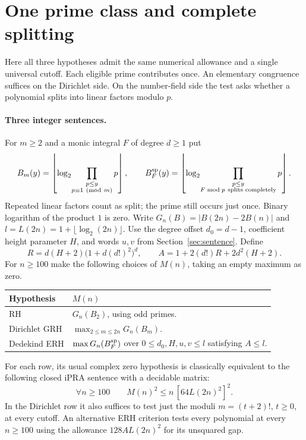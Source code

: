 \section{One prime class and complete splitting}\label{sec:split}
Here all three hypotheses admit the same numerical allowance and a single universal cutoff. Each eligible prime contributes once. An elementary congruence suffices on the Dirichlet side. On the number-field side the test asks whether a polynomial splits into linear factors modulo $p$.

\paragraph{Three integer sentences.}
For $m\ge2$ and a monic integral $F$ of degree $d\ge1$ put
\[
 B_m(y)=\left\lfloor\log_2\!\prod_{\substack{p\le y\\p\equiv1\ ({\rm mod}\ m)}}p\right\rfloor,
 \qquad
 B_F^{\rm sp}(y)=\left\lfloor\log_2\!\prod_{\substack{p\le y\\F\bmod p\ \text{splits completely}}}p\right\rfloor .
\]
Repeated linear factors count as split; the prime still occurs just once. Binary logarithm of the product $1$ is zero. Write $G_n(B)=|B(2n)-2B(n)|$ and $l=L(2n)=1+\lfloor\log_2(2n)\rfloor$. Use the degree offset $d_0=d-1$, coefficient height parameter $H$, and words $u,v$ from Section~\ref{sec:sentence}. Define
\[
 R=d(H+2)\bigl(1+d(d!)^2\bigr)^d,\qquad
 A=1+2(d!)R+2d^2(H+2).
\]
For $n\ge100$ make the following choices of $M(n)$, taking an empty maximum as zero.
\begin{center}\small
\begin{tabular}{@{}lp{.76\linewidth}@{}}\toprule
Hypothesis & $M(n)$\\\midrule
RH & $G_n(B_2)$, using odd primes.\\[3pt]
Dirichlet GRH & $\max_{2\le m\le2n}G_n(B_m)$.\\[3pt]
Dedekind ERH & $\max G_n(B_F^{\rm sp})$ over $0\le d_0,H,u,v\le l$ satisfying $A\le l$.\\\bottomrule
\end{tabular}
\end{center}
\begin{theorem}\label{thm:split}
For each row, its usual complex zero hypothesis is classically equivalent to the following closed iPRA sentence with a decidable matrix:
\[
                \forall n\ge100\qquad M(n)^2\le n\,[64 L(2n)^2]^2.
\]
In the Dirichlet row it also suffices to test just the moduli $m=(t+2)!$, $t\ge0$, at every cutoff. An alternative ERH criterion tests every polynomial at every $n\ge100$ using the allowance $128 A L(2n)^2$ for its unsquared gap.
\end{theorem}

